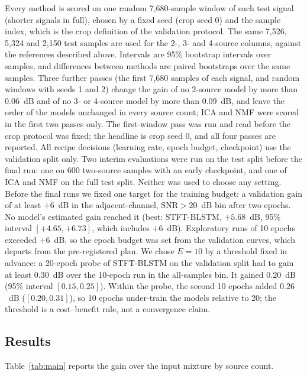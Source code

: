 \documentclass[journal]{IEEEtran}
\begin{document}
Every method is scored on one random 7,680-sample window of each test signal (shorter
signals in full), chosen by a fixed seed (crop seed 0) and the sample index, which is the
crop definition of the validation protocol. The same 7,526, 5,324 and 2,150 test samples are used for
the 2-, 3- and 4-source columns, against the
references described above. Intervals are 95\% bootstrap intervals over samples, and
differences between methods are paired bootstraps over the same samples. Three further passes
(the first 7,680 samples of each signal, and random windows with seeds 1 and 2) change the gain of
no 2-source model by more than 0.06~dB and of no 3- or 4-source model by more than 0.09~dB, and leave the order of the
models unchanged in every source count; ICA and NMF were scored in the first two passes only. The
first-window pass was run and read before the crop protocol was fixed; the headline is crop seed 0, and all four passes are
reported. All recipe decisions (learning rate, epoch budget, checkpoint) use the
validation split only. Two interim evaluations were run on the test split before the
final run: one on 600 two-source samples with an early checkpoint, and one of ICA and NMF on
the full test split. Neither was used to choose any setting.
Before the final runs we fixed one target for the training budget: a validation gain of at least $+6$~dB in the adjacent-channel, SNR${>}20$~dB bin after two epochs. No model's estimated gain reached it (best: STFT-BLSTM, $+5.68$~dB, 95\% interval $[+4.65,+6.73]$, which includes $+6$~dB). Exploratory runs of 10 epochs exceeded $+6$~dB, so the epoch budget was set from the validation curves, which departs from the pre-registered plan. We chose $E\!=\!10$ by a threshold fixed in advance: a 20-epoch probe of STFT-BLSTM on the validation split had to gain at least $0.30$~dB over the 10-epoch run in the all-samples bin. It gained $0.20$~dB (95\% interval $[0.15,0.25]$). Within the probe, the second 10 epochs added $0.26$~dB ($[0.20,0.31]$), so 10 epochs under-train the models relative to 20; the threshold is a cost--benefit rule, not a convergence claim.

\subsection{Results}

Table~\ref{tab:main} reports the gain over the input mixture by source count.

\begin{table}[t]
\centering
\caption{Gain over the input mixture (dB, PI-SI-SINR) on the test split, by source
count (random 7,680-sample windows, crop seed 0). Deep models at 2 sources: mean over three
seeds (range of the seeds); deep models at 3 and 4 sources: one seed, 95\% bootstrap interval;
all other rows: 95\% bootstrap interval over test samples. The input level is $-4.4$ / $-9.3$ / $-12.0$~dB.}
\label{tab:main}
\resizebox{\columnwidth}{!}{%
}
\end{table}
\end{document}
